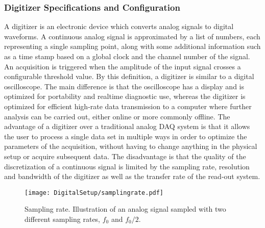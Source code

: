\documentclass[main.tex]{subfiles}
\begin{document}
\subsubsection{Digitizer Specifications and Configuration}
A digitizer is an electronic device which converts analog signals to digital waveforms. A continuous analog signal is approximated by a list of numbers, each representing a single sampling point, along with some additional information such as a time stamp based on a global clock and the channel number of the signal. An acquisition is triggered when the amplitude of the input signal crosses a configurable threshold value.
By this definition, a digitizer is similar to a digital oscilloscope. The main difference is that the oscilloscope has a display and is optimized for portability and realtime diagnostic use, whereas the digitizer is optimized for efficient high-rate data transmission to a computer where further analysis can be carried out, either online or more commonly offline.
The advantage of a digitizer over a traditional analog DAQ system is that it allows the user to process a single data set in multiple ways in order to optimize the parameters of the acquisition, without having to change anything in the physical setup or acquire subsequent data. The disadvantage is that the quality of the discretization of a continuous signal is limited by the sampling rate, resolution and bandwidth of the digitizer as well as the transfer rate of the read-out system.

\begin{figure}[ht]
	\centering
    	\texttt{[image: DigitalSetup/samplingrate.pdf]}
        \caption[Sampling rate.]{Sampling rate. Illustration of an analog signal sampled with two different sampling rates, $f_0$ and $f_0/2$.}
	    \label{fig:samplingrate} 
\end{figure}
\end{document}
